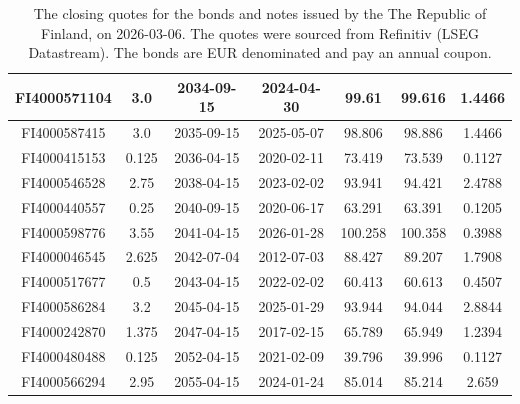 \documentclass[a4paper]{artikel3}
\numberwithin{equation}{section}
\numberwithin{theorem}{section}
\numberwithin{proposition}{section}
\numberwithin{lemma}{section}
\begin{document}
\begin{table}[h!]
\begin{tabular}{| c | c | c | c | c | c | c |}
\hline
FI4000571104 & 3.0 & 2034-09-15 & 2024-04-30 & 99.61 & 99.616 & 1.4466 \\
\hline
FI4000587415 & 3.0 & 2035-09-15 & 2025-05-07 & 98.806 & 98.886 & 1.4466 \\
\hline
FI4000415153 & 0.125 & 2036-04-15 & 2020-02-11 & 73.419 & 73.539 & 0.1127 \\
\hline
FI4000546528 & 2.75 & 2038-04-15 & 2023-02-02 & 93.941 & 94.421 & 2.4788 \\
\hline
FI4000440557 & 0.25 & 2040-09-15 & 2020-06-17 & 63.291 & 63.391 & 0.1205 \\
\hline
FI4000598776 & 3.55 & 2041-04-15 & 2026-01-28 & 100.258 & 100.358 & 0.3988 \\
\hline
FI4000046545 & 2.625 & 2042-07-04 & 2012-07-03 & 88.427 & 89.207 & 1.7908 \\
\hline
FI4000517677 & 0.5 & 2043-04-15 & 2022-02-02 & 60.413 & 60.613 & 0.4507 \\
\hline
FI4000586284 & 3.2 & 2045-04-15 & 2025-01-29 & 93.944 & 94.044 & 2.8844 \\
\hline
FI4000242870 & 1.375 & 2047-04-15 & 2017-02-15 & 65.789 & 65.949 & 1.2394 \\
\hline
FI4000480488 & 0.125 & 2052-04-15 & 2021-02-09 & 39.796 & 39.996 & 0.1127 \\
\hline
FI4000566294 & 2.95 & 2055-04-15 & 2024-01-24 & 85.014 & 85.214 & 2.659 \\
\hline
    \end{tabular}
    \caption{The closing quotes for the bonds and notes issued by the The Republic of Finland, on 2026-03-06. The quotes were sourced from Refinitiv (LSEG Datastream). The bonds are EUR denominated and pay an annual coupon.}
    \label{tab:bonds_20260306}
\end{table}
\end{document}
